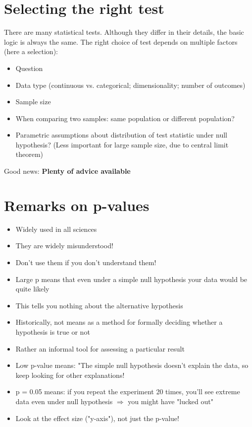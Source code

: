 \documentclass[11pt]{article}
\begin{document}
\section*{Selecting the right test}

There are many statistical tests. Although they differ in their details, the basic logic is always the same. The right choice of test depends on multiple factors (here a selection):
\begin{itemize}
	\item Question
	\item Data type (continuous vs. categorical; dimensionality; number of outcomes)
	\item Sample size
	\item When comparing two samples: same population or different population?
	\item Parametric assumptions about distribution of test statistic under null hypothesis? (Less important for large sample size, due to central limit theorem)
\end{itemize}

Good news: \textbf{Plenty of advice available}

\section*{Remarks on p-values}
\begin{itemize}
	\item Widely used in all sciences
	\item They are widely misunderstood!
	\item Don't use them if you don't understand them!
	\item Large p means that even under a simple null hypothesis your data would be quite likely
	\item This tells you nothing about the alternative hypothesis
\end{itemize}

\begin{itemize}
	\item Historically, not means as a method for formally deciding whether a hypothesis is true or not
	\item Rather an informal tool for assessing a particular result
	\item Low p-value means: "The simple null hypothesis doesn't explain the data, so keep looking for other explanations!
	\item p = 0.05 means: if you repeat the experiment 20 times, you'll see extreme data even under null hypothesis $\Rightarrow$ you might have "lucked out"
	\item Look at the effect size ("y-axis"), not just the p-value!
\end{itemize}
\end{document}

